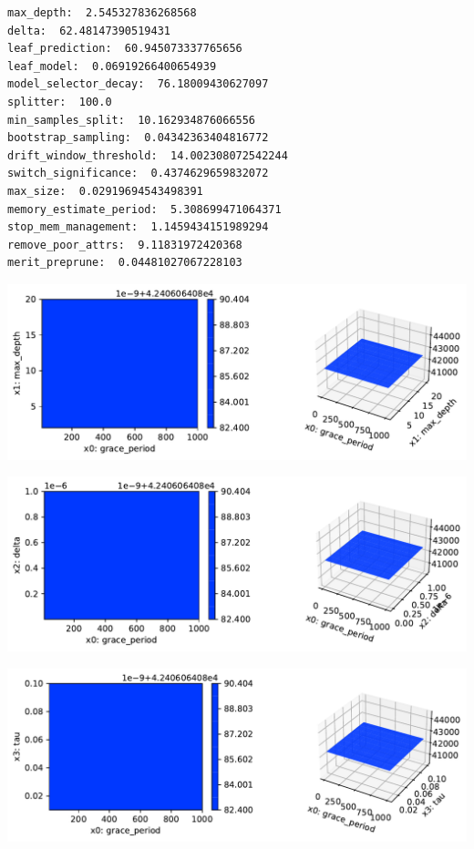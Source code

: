 \documentclass[
  letterpaper,
  DIV=11,
  numbers=noendperiod]{scrreprt}
\begin{document}
\begin{verbatim}
max_depth:  2.545327836268568
delta:  62.48147390519431
leaf_prediction:  60.945073337765656
leaf_model:  0.06919266400654939
model_selector_decay:  76.18009430627097
splitter:  100.0
min_samples_split:  10.162934876066556
bootstrap_sampling:  0.04342363404816772
drift_window_threshold:  14.002308072542244
switch_significance:  0.4374629659832072
max_size:  0.02919694543498391
memory_estimate_period:  5.308699471064371
stop_mem_management:  1.1459434151989294
remove_poor_attrs:  9.11831972420368
merit_preprune:  0.04481027067228103
\end{verbatim}

\includegraphics{024_spot_hpt_river_friedman_hatr_files/figure-pdf/cell-42-output-2.pdf}

\includegraphics{024_spot_hpt_river_friedman_hatr_files/figure-pdf/cell-42-output-3.pdf}

\includegraphics{024_spot_hpt_river_friedman_hatr_files/figure-pdf/cell-42-output-4.pdf}
\end{document}
